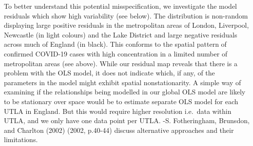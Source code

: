 \documentclass[
  letterpaper,
  krantz2]{style/krantz}
\begin{document}
To better understand this potential misspecification, we investigate the
model residuals which show high variability (see below). The
distribution is non-random displaying large positive residuals in the
metropolitan areas of London, Liverpool, Newcastle (in light colours)
and the Lake District and large negative residuals across much of
England (in black). This conforms to the spatial pattern of confirmed
COVID-19 cases with high concentration in a limited number of
metropolitan areas (see above). While our residual map reveals that
there is a problem with the OLS model, it does not indicate which, if
any, of the parameters in the model might exhibit spatial
nonstationarity. A simple way of examining if the relationships being
modelled in our global OLS model are likely to be stationary over space
would be to estimate separate OLS model for each UTLA in England. But
this would require higher resolution i.e.~data within UTLA, and we only
have one data point per UTLA. -S. Fotheringham, Brunsdon, and Charlton
(2002) (2002, p.40-44) discuss alternative approaches and their
limitations.
\end{document}
